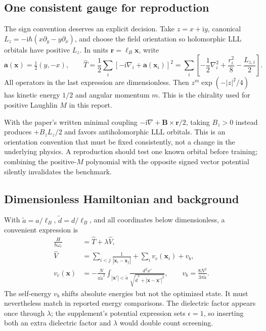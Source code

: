 \documentclass[11pt,letterpaper]{article}
\newcommand{\rr}{\mathbf r}
\newcommand{\ii}{\mathrm i}
\begin{document}
\subsection{One consistent gauge for reproduction}

The sign convention deserves an explicit decision. Take $z=x+\ii y$, canonical $L_z=-\ii\hbar(x\partial_y-y\partial_x)$, and choose the field orientation so holomorphic LLL orbitals have positive $L_z$. In units $\rr=\ell_B\mathbf x$, write
\begin{equation}
 \mathbf a(\mathbf x)=\tfrac12(y,-x),\qquad
 \hat T=\frac12\sum_i[-\ii\nabla_i+\mathbf a(\mathbf x_i)]^2
 =\sum_i\left[-\frac12\nabla_i^2+\frac{r_i^2}{8}-\frac{L_{z,i}}2\right].
 \label{eq:gauge}
\end{equation}
All operators in the last expression are dimensionless. Then $z^m\exp(-|z|^2/4)$ has kinetic energy $1/2$ and angular momentum $m$. This is the chirality used for positive Laughlin $M$ in this report.

With the paper's written minimal coupling $-\ii\nabla+\mathbf B\times\rr/2$, taking $B_z>0$ instead produces $+B_z L_z/2$ and favors antiholomorphic LLL orbitals. This is an orientation convention that must be fixed consistently, not a change in the underlying physics. A reproduction should test one known orbital before training; combining the positive-$M$ polynomial with the opposite signed vector potential silently invalidates the benchmark.

\subsection{Dimensionless Hamiltonian and background}

With $\tilde a=a/\ell_B$, $\tilde d=d/\ell_B$, and all coordinates below dimensionless, a convenient expression is
\begin{align}
 \frac H{\hbar\omega_c}&=\hat T+\lambda\hat V,\label{eq:dimlessH}\\
 \hat V&=\sum_{i<j}\frac1{|\mathbf x_i-\mathbf x_j|}
 +\sum_i v_c(\mathbf x_i)+v_b,\\
 v_c(\mathbf x)&=-\frac N{\pi\tilde a^2}
 \int_{|\mathbf x'|<\tilde a}\frac{d^2x'}{\sqrt{\tilde d^2+|\mathbf x-\mathbf x'|^2}},\qquad
 v_b=\frac{8N^2}{3\pi\tilde a}.
 \label{eq:background}
\end{align}
The self-energy $v_b$ shifts absolute energies but not the optimized state. It must nevertheless match in reported energy comparisons. The dielectric factor appears once through $\lambda$; the supplement's potential expression sets $\epsilon=1$, so inserting both an extra dielectric factor and $\lambda$ would double count screening.
\end{document}
